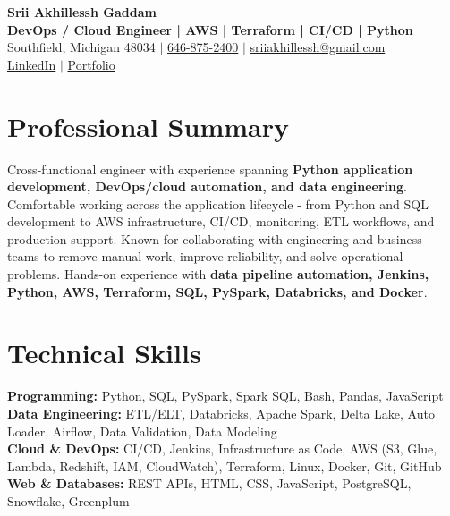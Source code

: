 \documentclass[letterpaper,10pt]{article}
\begin{document}
\fontsize{9.35pt}{10.45pt}\selectfont

\begin{center}
    {\LARGE \textbf{Srii Akhillessh Gaddam}} \\[-1pt]
    \textbf{DevOps / Cloud Engineer | AWS | Terraform | CI/CD | Python} \\[2pt]
    Southfield, Michigan 48034 $|$
    \href{tel:6468752400}{646-875-2400} $|$
    \href{mailto:sriiakhillessh@gmail.com}{sriiakhillessh@gmail.com} \\[1pt]
    \href{https://www.linkedin.com/in/srii-akhiilessh-gaddam-b48668191/}{LinkedIn} $|$
    \href{https://sriiakhillesshg.github.io/portfolio/}{Portfolio}
\end{center}
\vspace{-8pt}

\section{Professional Summary}
\small{Cross-functional engineer with experience spanning \textbf{Python application development, DevOps/cloud automation, and data engineering}. Comfortable working across the application lifecycle - from Python and SQL development to AWS infrastructure, CI/CD, monitoring, ETL workflows, and production support. Known for collaborating with engineering and business teams to remove manual work, improve reliability, and solve operational problems. Hands-on experience with \textbf{data pipeline automation, Jenkins, Python, AWS, Terraform, SQL, PySpark, Databricks, and Docker}.}

\section{Technical Skills}
\small{
\textbf{Programming:} Python, SQL, PySpark, Spark SQL, Bash, Pandas, JavaScript \\
\textbf{Data Engineering:} ETL/ELT, Databricks, Apache Spark, Delta Lake, Auto Loader, Airflow, Data Validation, Data Modeling \\
\textbf{Cloud \& DevOps:} CI/CD, Jenkins, Infrastructure as Code, AWS (S3, Glue, Lambda, Redshift, IAM, CloudWatch), Terraform, Linux, Docker, Git, GitHub \\
\textbf{Web \& Databases:} REST APIs, HTML, CSS, JavaScript, PostgreSQL, Snowflake, Greenplum
}
\end{document}
